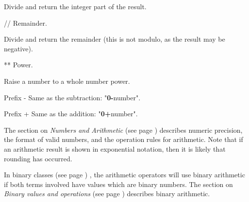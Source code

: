 \begin{description}
\begin{description}
Divide and return the integer part of the result.
\item{//}
Remainder.

Divide and return the remainder (this is not modulo, as the result
may be negative).
\item{**}
Power.

Raise a number to a whole number power.
\item{Prefix -}
Same as the subtraction: "\textbf{0-}number".
\item{Prefix +}
Same as the addition: "\textbf{0+}number".
\end{description}
The section on  \emph{Numbers and Arithmetic} (see page \pageref{refnums}) 
describes numeric precision, the format of valid numbers, and the
operation rules for arithmetic.  Note that if an arithmetic result is
shown in exponential notation, then it is likely that rounding has
occurred.
 
In  binary classes (see page \pageref{refbincla}) , the arithmetic operators will use
binary arithmetic if both terms involved have values which are binary
numbers.
The section on  \emph{Binary values and operations} (see page \pageref{refbinary}) 
describes binary arithmetic.
\item[Comparative]\label{refcomps}


\end{description}
